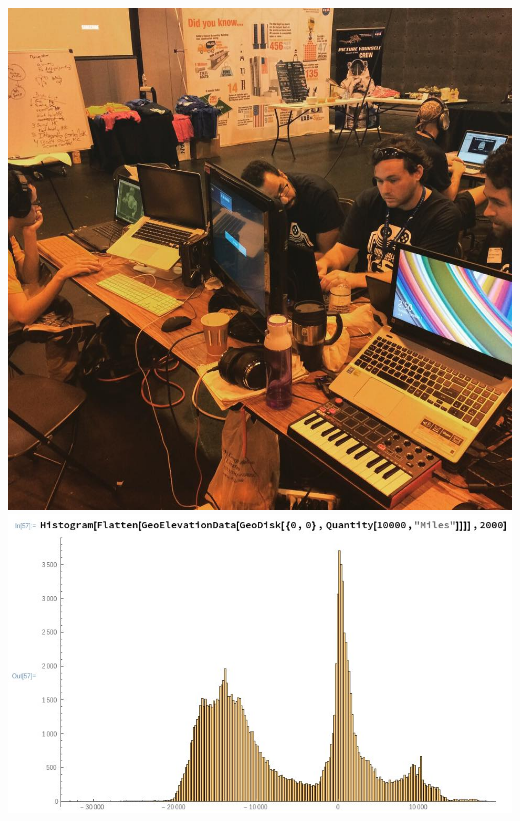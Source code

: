 \documentclass[../r.tex]{subfiles}
\begin{document}
\noindent
\href{https://twitter.com/randompast/status/915414816638021633}{\includegraphics[scale=0.15]{../fun/indie_galactic_2.jpg}}
\href{https://twitter.com/randompast/status/794967546340356096}{\includegraphics[scale=0.28]{../scientific/WL_sea_level.jpeg}}


\newpage
\end{document}
